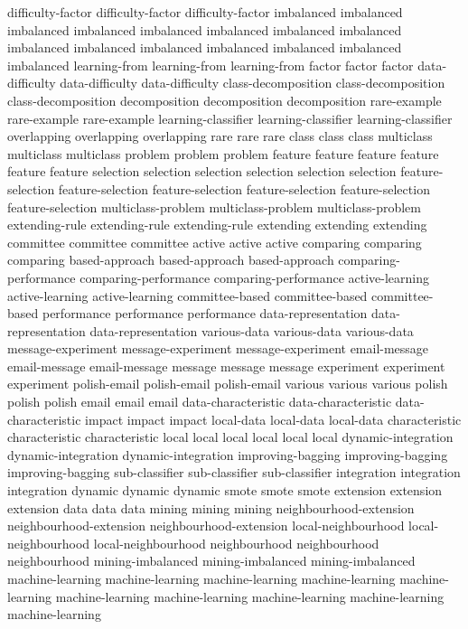 difficulty-factor	difficulty-factor	difficulty-factor	
imbalanced	imbalanced	imbalanced	imbalanced	imbalanced	imbalanced	imbalanced	imbalanced	imbalanced	imbalanced	imbalanced	imbalanced	imbalanced	imbalanced	imbalanced	
learning-from	learning-from	learning-from	
factor	factor	factor	
data-difficulty	data-difficulty	data-difficulty	
class-decomposition	class-decomposition	class-decomposition	
decomposition	decomposition	decomposition	
rare-example	rare-example	rare-example	
learning-classifier	learning-classifier	learning-classifier	
overlapping	overlapping	overlapping	
rare	rare	rare	
class	class	class	
multiclass	multiclass	multiclass	
problem	problem	problem	
feature	feature	feature	feature	feature	feature	
selection	selection	selection	selection	selection	selection	
feature-selection	feature-selection	feature-selection	feature-selection	feature-selection	feature-selection	
multiclass-problem	multiclass-problem	multiclass-problem	
extending-rule	extending-rule	extending-rule	
extending	extending	extending	
committee	committee	committee	
active	active	active	
comparing	comparing	comparing	
based-approach	based-approach	based-approach	
comparing-performance	comparing-performance	comparing-performance	
active-learning	active-learning	active-learning	
committee-based	committee-based	committee-based	
performance	performance	performance	
data-representation	data-representation	data-representation	
various-data	various-data	various-data	
message-experiment	message-experiment	message-experiment	
email-message	email-message	email-message	
message	message	message	
experiment	experiment	experiment	
polish-email	polish-email	polish-email	
various	various	various	
polish	polish	polish	
email	email	email	
data-characteristic	data-characteristic	data-characteristic	
impact	impact	impact	
local-data	local-data	local-data	
characteristic	characteristic	characteristic	
local	local	local	local	local	local	
dynamic-integration	dynamic-integration	dynamic-integration	
improving-bagging	improving-bagging	improving-bagging	
sub-classifier	sub-classifier	sub-classifier	
integration	integration	integration	
dynamic	dynamic	dynamic	
smote	smote	smote	
extension	extension	extension	
data	data	data	
mining	mining	mining	
neighbourhood-extension	neighbourhood-extension	neighbourhood-extension	
local-neighbourhood	local-neighbourhood	local-neighbourhood	
neighbourhood	neighbourhood	neighbourhood	
mining-imbalanced	mining-imbalanced	mining-imbalanced	
machine-learning	machine-learning	machine-learning	machine-learning	machine-learning	machine-learning	machine-learning	machine-learning	machine-learning	machine-learning	
